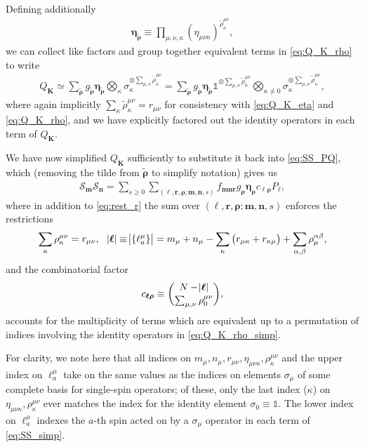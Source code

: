 \documentclass[aps,notitlepage,nofootinbib,11pt]{revtex4-1}
\newcommand{\p}[1]{\left(#1\right)} %
\renewcommand{\set}[1]{\left\{#1\right\}} %
\renewcommand{\v}{\bm} %
\renewcommand{\S}{\mathcal{S}}
\newcommand{\1}{\mathds{1}}
\begin{document}
Defining additionally
\begin{align}
  \v\eta_{\tilde{\v\rho}}
  \equiv \prod_{\mu,\nu,\kappa}
  \p{\eta_{\mu\nu\kappa}}^{\tilde\rho^{\mu\nu}_\kappa},
\end{align}
we can collect like factors and group together equivalent terms in
\eqref{eq:Q_K_rho} to write
\begin{align}
  Q_{\v K}
  \simeq \sum_{\tilde{\v\rho}} g_{\tilde{\v\rho}} \v\eta_{\tilde{\v\rho}}
  \bigotimes_{\kappa}
  \sigma_\kappa^{\otimes\sum_{\mu,\nu}\tilde\rho^{\mu\nu}_\kappa}
  = \sum_{\tilde{\v\rho}} g_{\tilde{\v\rho}} \v\eta_{\tilde{\v\rho}}
  \1^{\otimes\sum_{\mu,\nu}\tilde\rho^{\mu\nu}_0}
  \bigotimes_{\kappa\ne0}
  \sigma_\kappa^{\otimes\sum_{\mu,\nu}\tilde\rho^{\mu\nu}_\kappa},
  \label{eq:Q_K_rho_simp}
\end{align}
where again implicitly
$\sum_\kappa\tilde\rho^{\mu\nu}_\kappa=r_{\mu\nu}$ for consistency
with \eqref{eq:Q_K_eta} and \eqref{eq:Q_K_rho}, and we have explicitly
factored out the identity operators in each term of $Q_{\v K}$.

We have now simplified $Q_{\v K}$ sufficiently to substitute it back
into \eqref{eq:SS_PQ}, which (removing the tilde from $\tilde{\v\rho}$
to simplify notation) gives us
\begin{align}
  \S_{\v m} \S_{\v n}
  = \sum_{s\ge0} \sum_{\p{\v\ell,\v r,\v\rho;\v m,\v n,s}}
  f_{\v m\v n\v r} g_{\v\rho} \v\eta_{\v\rho} c_{\v\ell\v\rho} P_{\v\ell},
  \label{eq:SS_simp}
\end{align}
where in addition to \eqref{eq:rest_r} the sum over
$\p{\v\ell,\v r,\v\rho;\v m,\v n,s}$ enforces the restrictions
\begin{align}
  \sum_{\kappa} \rho^{\mu\nu}_\kappa = r_{\mu\nu},
  &&
  \abs{\v\ell} \equiv \abs{\set{\ell^\mu_a}}
  = m_\mu + n_\mu - \sum_\kappa \p{r_{\mu\kappa}+r_{\kappa\mu}}
  + \sum_{\alpha,\beta} \rho^{\alpha\beta}_\mu,
\end{align}
and the combinatorial factor
\begin{align}
  c_{\v\ell\v\rho}
  \equiv { N - \abs{\v\ell} \choose \sum_{\mu,\nu}\rho^{\mu\nu}_0},
\end{align}
accounts for the multiplicity of terms which are equivalent up to a
permutation of indices involving the identity operators in
\eqref{eq:Q_K_rho_simp}.

For clarity, we note here that all indices on
$m_\mu,n_\mu,r_{\mu\nu},\eta_{\mu\nu\kappa},\rho^{\mu\nu}_\kappa$ and
the upper index on $\ell^\mu_a$ take on the same values as the indices
on elements $\sigma_\mu$ of some complete basis for single-spin
operators; of these, only the last index ($\kappa$) on
$\eta_{\mu\nu\kappa},\rho^{\mu\nu}_\kappa$ ever matches the index for
the identity element $\sigma_0\equiv\1$.  The lower index on
$\ell^\mu_a$ indexes the $a$-th spin acted on by a $\sigma_\mu$
operator in each term of \eqref{eq:SS_simp}.
\end{document}
